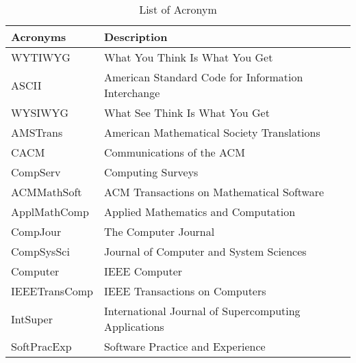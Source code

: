 \begin{table}[!h]
\centering
\caption{List of Acronym}	
\begin{tabular}{p{3cm}| l} \hline \hline
Acronyms  & Description \\ \hline	
WYTIWYG   & What You Think Is What You Get \\
ASCII     & American Standard Code for Information Interchange \\
WYSIWYG   & What See Think Is What You Get \\
AMSTrans & American Mathematical Society Translations \\
CACM & Communications of the {ACM} \\
CompServ  & Computing Surveys \\
ACMMathSoft & {ACM} Transactions on Mathematical Software \\
ApplMathComp & Applied Mathematics and Computation\\
CompJour & The Computer Journal\\
CompSysSci & Journal of Computer and System Sciences\\
Computer & {IEEE} Computer\\
IEEETransComp & {IEEE} Transactions on Computers\\
IntSuper & International Journal of Supercomputing Applications\\
SoftPracExp & Software Practice and Experience\\\hline \hline
\end{tabular}
\label{TableofAcronym}
\end{table}